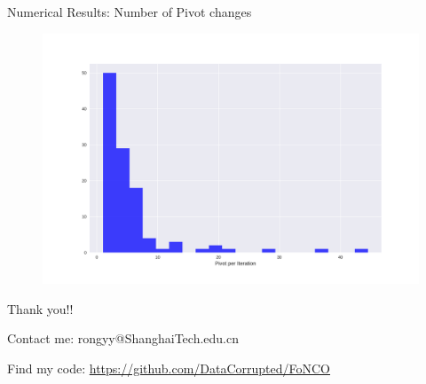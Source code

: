 \documentclass[8pt]{beamer}
\begin{document}
%		

	\begin{frame}[c]{Numerical Results:  Number of Pivot changes }
		\begin{figure}[H]
			\includegraphics[width=\textwidth]{pic/pivot-per-iteration}
		\end{figure}
	\end{frame}

%		 
		
	\begin{frame}[c]{ }
		\centerline{\red Thank you!!}
		\vspace{3em}
		\centerline{\red  Contact me: rongyy@ShanghaiTech.edu.cn}
		\vspace{3em}
		\centerline{\red Find my code: \underline  {  https://github.com/DataCorrupted/FoNCO}}
	\end{frame}
\end{document}
